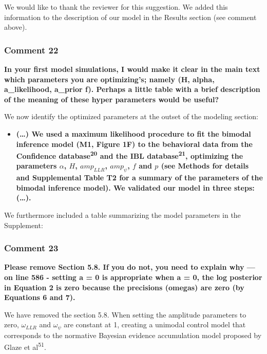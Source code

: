 \documentclass[
]{article}
\providecommand{\tightlist}{%
  \setlength{\itemsep}{0pt}\setlength{\parskip}{0pt}}
\begin{document}
We would like to thank the reviewer for this suggestion. We added this
information to the description of our model in the Results section (see
comment above).

\hypertarget{comment-22}{%
\subsubsection{Comment 22}\label{comment-22}}

\textbf{In your first model simulations, I would make it clear in the
main text which parameters you are optimizing's; namely (H, alpha,
a\_likelihood, a\_prior f). Perhaps a little table with a brief
description of the meaning of these hyper parameters would be useful?}

We now identify the optimized parameters at the outset of the modeling
section:

\begin{itemize}
\tightlist
\item
  \textbf{(\ldots) We used a maximum likelihood procedure to fit the
  bimodal inference model (M1, Figure 1F) to the behavioral data from
  the Confidence database\textsuperscript{20} and the IBL
  database\textsuperscript{21}, optimizing the parameters \(\alpha\),
  \(H\), \(amp_{LLR}\), \(amp_{\psi}\), \(f\) and \(p\) (see Methods for
  details and Supplemental Table T2 for a summary of the parameters of
  the bimodal inference model). We validated our model in three steps:
  (\ldots).}
\end{itemize}

We furthermore included a table summarizing the model parameters in the
Supplement:

\hypertarget{comment-23}{%
\subsubsection{Comment 23}\label{comment-23}}

\textbf{Please remove Section 5.8. If you do not, you need to explain
why --- on line 586 - setting a = 0 is appropriate when a = 0, the log
posterior in Equation 2 is zero because the precisions (omegas) are zero
(by Equations 6 and 7).}

We have removed the section 5.8. When setting the amplitude parameters
to zero, \(\omega_{LLR}\) and \(\omega_{\psi}\) are constant at 1,
creating a unimodal control model that corresponds to the normative
Bayesian evidence accumulation model proposed by Glaze et
al\textsuperscript{51}.
\end{document}
